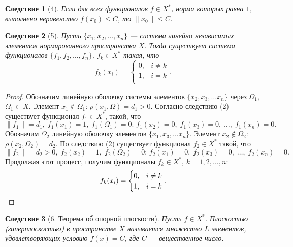 \documentclass[12pt,a4paper,titlepage,oneside]{book}
\theoremstyle{definition}
\theoremstyle{plain}
\theoremstyle{break}
\theoremstyle{remark}
\theoremstyle{remark}
\theoremstyle{remark}
\theoremstyle{remark}
\theoremstyle{plain}
\theoremstyle{plain}
\newtheorem*{corollary}{Следствие}
\begin{document}
\begin{corollary}[4]
Если для всех функционалов $f \in X^*$, норма которых равна $1$, выполнено неравенство $f(x_0)\leqslant C$, то $\lVert x_0 \rVert \leqslant C$.
\end{corollary}

\begin{corollary}[5]
Пусть $\{ x_1, x_2, \ldots, x_n\}$ --- система линейно независимых элементов нормированного пространства $X$. Тогда существует система функционалов $\{ f_1, f_2, \ldots, f_n\}$, $f_k \in X^*$ такая, что 
\begin{equation*}
f_k(x_i) = 
\begin{cases}
   0, &i\neq k\\
   1, &i=k\\
\end{cases}.
\end{equation*}
\end{corollary}
\begin{proof}
Обозначим линейную оболочку системы элементов $\{ x_2, x_3, \ldots x_n\}$ через $\Omega_1$, $\Omega_1 \subset X$. Элемент $x_1 \notin \Omega_1$: $\rho(x_1, \Omega)=d_1>0$. Согласно следствию (2) существует функционал $f_1 \in X^*$, такой, что 
\begin{equation*}
\lVert f_1 \rVert =d_1, \; f_1(x_1)=1, \; f_1(\Omega_1)=0 \mbox{: } f_1(x_2)=0, \; f_1(x_3)=0, \;\ldots, \; f_1(x_n)=0.
\end{equation*}
Обозначим $\Omega_2$ линейную оболочку элементов $\{ x_1, x_3, \ldots x_n\}$. Элемент $x_2 \notin \Omega_2$: $\rho(x_2, \Omega_2)=d_2$. По следствию (2) существует функционал $f_2 \in X^*$ такой, что 
\begin{equation*}
\lVert f_2 \rVert=d_2 > 0, \; f_2(x_2)=1, \; f_2(\Omega_2)=0 \mbox{: } f_2(x_1)=0, \; f_2(x_3)=0, \;\ldots, \; f_2(x_n)=0.
\end{equation*}
Продолжая этот процесс, получим функционалы $f_k \in X^*$, $k=1, 2, \ldots, n$:
\begin{equation*}
f_k(x_i) = 
\begin{cases}
   0, &i\neq k\\
   1, &i=k\\
\end{cases}.
\qedhere
\end{equation*}
\end{proof}
\begin{corollary}[6. Теорема об опорной плоскости]
Пусть $f \in X^*$. Плоскостью (гиперплоскостью) в пространстве $X$ называется множество $L$ элементов, удовлетворяющих условию $f(x)=C$, где $C$ --- вещественное число.
\end{corollary}
\end{document}
